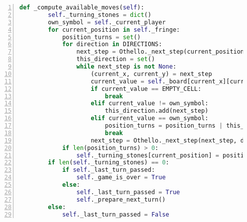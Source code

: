 \begin{lstlisting}[caption = {Die Funktion \code{\_compute\_available\_moves}}, language = python, captionpos = t , numbers=left, label={lst:fct-compute-available-moves}]
    def _compute_available_moves(self):
        self._turning_stones = dict()
        own_symbol = self._current_player
        for current_position in self._fringe:
            position_turns = set()
            for direction in DIRECTIONS:
                next_step = Othello._next_step(current_position, direction)
                this_direction = set()
                while next_step is not None:
                    (current_x, current_y) = next_step
                    current_value = self._board[current_x][current_y]
                    if current_value == EMPTY_CELL:
                        break
                    elif current_value != own_symbol:
                        this_direction.add(next_step)
                    elif current_value == own_symbol:
                        position_turns = position_turns | this_direction
                        break
                    next_step = Othello._next_step(next_step, direction)
            if len(position_turns) > 0:
                self._turning_stones[current_position] = position_turns
        if len(self._turning_stones) == 0:
            if self._last_turn_passed:
                self._game_is_over = True
            else:
                self._last_turn_passed = True
                self._prepare_next_turn()
        else:
            self._last_turn_passed = False
\end{lstlisting}
